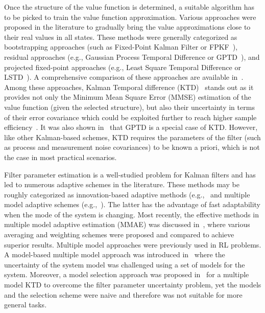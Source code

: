 \documentclass{ieeeaccess}
\begin{document}
Once the structure of the value function is determined, a suitable algorithm has to be picked to train the value function approximation. Various approaches were proposed in the literature to gradually bring the value approximations close to their real values in all states. These methods were generally categorized as bootstrapping approaches (such as Fixed-Point Kalman Filter or FPKF~\cite{19}), residual approaches (e.g., Gaussian Process Temporal Difference or GPTD~\cite{20}), and projected fixed-point approaches (e.g., Least Square Temporal Difference or LSTD~\cite{21}). A comprehensive comparison of these approaches are available in~\cite{22}. Among these approaches, Kalman Temporal difference (KTD)~\cite{23} stands out as it provides not only the Minimum Mean Square Error (MMSE) estimation of the value function (given the selected structure), but also their uncertainty in terms of their error covariance which could be exploited further to reach higher sample efficiency~\cite{23}. It was also shown in~\cite{23} that GPTD is a special case of KTD. However, like other Kalman-based schemes, KTD requires the parameters of the filter (such as process and measurement noise covariances) to be known a priori, which is not the case in most practical scenarios.

Filter parameter estimation is a well-studied problem for Kalman filters and has led to numerous adaptive schemes in the literature. These methods may be roughly categorized as innovation-based adaptive methods (e.g.,~\cite{24} and multiple model adaptive schemes (e.g.,~\cite{25}). The latter has the advantage of fast adaptability when the mode of the system is changing. Most recently, the effective methods in multiple model adaptive estimation (MMAE) was discussed in~\cite{26}, where various averaging and weighting schemes were proposed and compared to achieve superior results. Multiple model approaches were previously used in RL problems. A model-based multiple model approach was introduced in~\cite{27} where the uncertainty of the system model was challenged using a set of models for the system. Moreover, a model selection approach was proposed in~\cite{28} for a multiple model KTD to overcome the filter parameter uncertainty problem, yet the models and the selection scheme were naive and therefore was not suitable for more general tasks.
\end{document}
